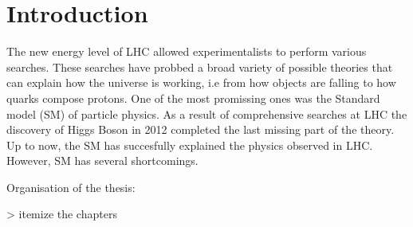 \chapter{Introduction}
The new energy level of LHC allowed experimentalists to perform various searches.
These searches have probbed a broad variety of possible theories that can explain how the universe is working, i.e
from how objects are falling to how quarks compose protons.
One of the most promissing ones was the Standard model (SM) of particle physics. As a result of comprehensive searches at LHC
the discovery of Higgs Boson in 2012 completed the last missing part of the theory.
Up to now, the SM has succesfully explained the physics observed in LHC.
However, SM has several shortcomings.



\newpage
Organisation of the thesis:

> itemize the chapters


